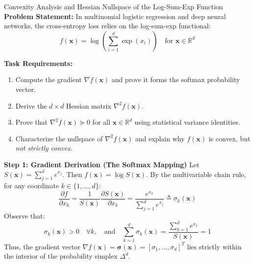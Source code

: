 \begin{examplebox}[breakable]{Convexity Analysis and Hessian Nullspace of the Log-Sum-Exp Function}
\textbf{Problem Statement:}
In multinomial logistic regression and deep neural networks, the cross-entropy loss relies on the log-sum-exp functional:
\begin{equation}
f(\mathbf{x}) = \log\left( \sum_{i=1}^d \exp(x_i) \right) \quad \text{for } \mathbf{x} \in \mathbb{R}^d
\end{equation}

\textbf{Task Requirements:}
\begin{enumerate}
    \item Compute the gradient $\nabla f(\mathbf{x})$ and prove it forms the softmax probability vector.
    \item Derive the $d \times d$ Hessian matrix $\nabla^2 f(\mathbf{x})$.
    \item Prove that $\nabla^2 f(\mathbf{x}) \succeq 0$ for all $\mathbf{x} \in \mathbb{R}^d$ using statistical variance identities.
    \item Characterize the nullspace of $\nabla^2 f(\mathbf{x})$ and explain why $f(\mathbf{x})$ is convex, but \emph{not strictly convex}.
\end{enumerate}

\tcblower

\textbf{Step 1: Gradient Derivation (The Softmax Mapping)}
Let $S(\mathbf{x}) = \sum_{j=1}^d e^{x_j}$. Then $f(\mathbf{x}) = \log S(\mathbf{x})$.
By the multivariable chain rule, for any coordinate $k \in \{1, \dots, d\}$:
\begin{equation}
\frac{\partial f}{\partial x_k} = \frac{1}{S(\mathbf{x})} \frac{\partial S(\mathbf{x})}{\partial x_k} = \frac{e^{x_k}}{\sum_{j=1}^d e^{x_j}} \triangleq \sigma_k(\mathbf{x})
\end{equation}
Observe that:
\begin{equation}
\sigma_k(\mathbf{x}) > 0 \quad \forall k, \quad \text{and} \quad \sum_{k=1}^d \sigma_k(\mathbf{x}) = \frac{\sum_{k=1}^d e^{x_k}}{S(\mathbf{x})} = 1
\end{equation}
Thus, the gradient vector $\nabla f(\mathbf{x}) = \boldsymbol{\sigma}(\mathbf{x}) = [\sigma_1, \dots, \sigma_d]^T$ lies strictly within the interior of the probability simplex $\Delta^d$.


\end{examplebox}
